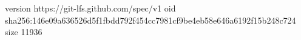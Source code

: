 version https://git-lfs.github.com/spec/v1
oid sha256:146e09a636526d5f1fbdd792f454cc7981cf9be4eb58e646a6192f15b248c724
size 11936
